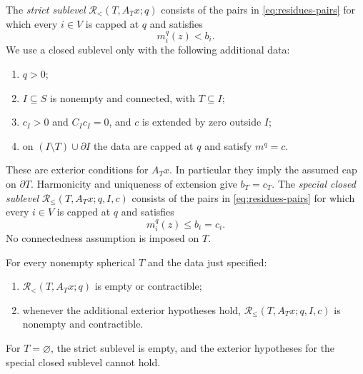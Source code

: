 The \emph{strict sublevel} $\mathcal R_{<}(T,A_Tx;q)$ consists of
the pairs in \eqref{eq:residues-pairs} for which every $i\in V$ is
capped at $q$ and satisfies
\begin{equation}
 \label{eq:residues-strict}
 m_i^q(z)<b_i.
\end{equation}
We use a closed sublevel only with the following additional data:
\begin{enumerate}[label=(\roman*)]
 \item $q>0$;
 \item $I\subseteq S$ is nonempty and connected, with $T\subseteq I$;
 \item $c_I>0$ and $C_Ic_I=0$, and $c$ is extended by zero outside $I$;
 \item on $(I\setminus T)\cup\partial I$ the data are capped at $q$
 and satisfy $m^q=c$.
\end{enumerate}
These are exterior conditions for $A_Tx$.  In particular they imply
the assumed cap on $\partial T$.  Harmonicity and uniqueness of
extension give $b_T=c_T$.  The \emph{special closed sublevel}
$\mathcal R_{\le}(T,A_Tx;q,I,c)$ consists of the pairs in
\eqref{eq:residues-pairs} for which every $i\in V$ is capped at $q$
and satisfies
\begin{equation}
 \label{eq:residues-closed}
 m_i^q(z)\le b_i=c_i.
\end{equation}
No connectedness assumption is imposed on $T$.

\begin{proposition}
\label{prop:residue-sublevels}
For every nonempty spherical $T$ and the data just specified:
\begin{enumerate}[label=(\roman*)]
 \item $\mathcal R_{<}(T,A_Tx;q)$ is empty or contractible;
 \item whenever the additional exterior hypotheses hold,
 $\mathcal R_{\le}(T,A_Tx;q,I,c)$ is nonempty and contractible.
\end{enumerate}
For $T=\varnothing$, the strict sublevel is empty, and the exterior
hypotheses for the special closed sublevel cannot hold.
\end{proposition}

